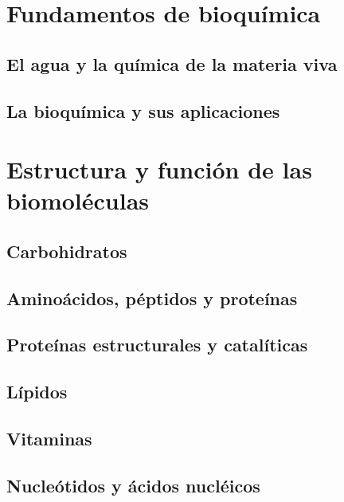 \documentclass{../summarie}
\begin{document}
\Portada
\Indice
\fancystyle
\onehalfspacing


\part{Fundamentos de bioquímica}

    \chapter{El agua y la química de la materia viva}
        
        
    \chapter{La bioquímica y sus aplicaciones}

\part{Estructura y función de las biomoléculas}

    \chapter{Carbohidratos}
    \chapter{Aminoácidos, péptidos y proteínas}
        
    \chapter{Proteínas estructurales y catalíticas}
    \chapter{Lípidos}
    
    \chapter{Vitaminas}
    \chapter{Nucleótidos y ácidos nucléicos}
\end{document}
